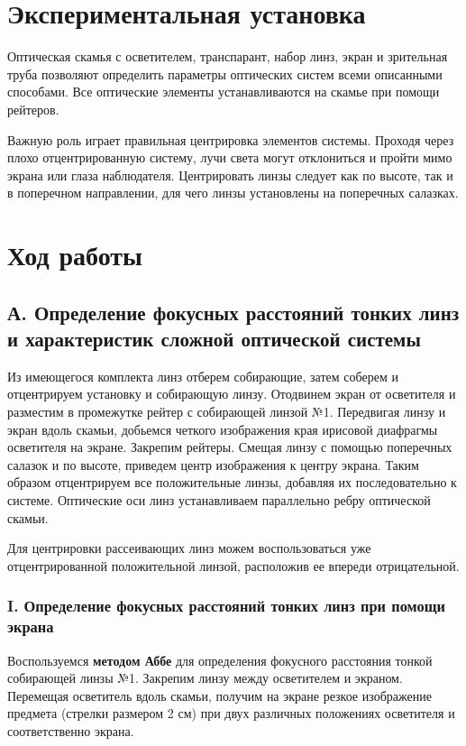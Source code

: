 \documentclass[a4paper,12pt]{article} %
\begin{document}
\section{Экспериментальная установка}
\hfill \break Оптическая скамья с осветителем, транспарант, набор линз, экран и зрительная труба позволяют определить параметры оптических систем всеми описанными способами. Все оптические элементы устанавливаются на скамье при помощи рейтеров.

\hfill \break Важную роль играет правильная центрировка элементов системы. Проходя через плохо отцентрированную систему, лучи света могут отклониться и пройти мимо экрана или глаза наблюдателя. Центрировать линзы следует как по высоте, так и в поперечном направлении, для чего линзы установлены на поперечных салазках.

\section{Ход работы}
\subsection*{А. Определение фокусных расстояний тонких линз и характеристик сложной оптической системы}
\hfill \break Из имеющегося комплекта линз отберем собирающие, затем соберем и отцентрируем установку и собирающую линзу. Отодвинем экран от осветителя и разместим в промежутке рейтер с собирающей линзой №1. Передвигая линзу и экран вдоль скамьи, добьемся четкого изображения края ирисовой диафрагмы осветителя на экране. Закрепим рейтеры. Смещая линзу с помощью поперечных салазок и по высоте, приведем центр изображения к центру экрана. Таким образом отцентрируем все положительные линзы, добавляя их последовательно к системе. Оптические оси линз устанавливаем параллельно ребру оптической скамьи.

\hfill \break Для центрировки рассеивающих линз можем воспользоваться уже отцентрированной положительной линзой, расположив ее впереди отрицательной.

\subsubsection*{I. Определение фокусных расстояний тонких линз при помощи экрана}
\hfill \break Воспользуемся \textbf{методом Аббе} для определения фокусного расстояния тонкой собирающей линзы №1. Закрепим линзу между осветителем и экраном. Перемещая осветитель вдоль скамьи, получим на экране резкое изображение предмета (стрелки размером 2 см) при двух различных положениях осветителя и соответственно экрана. 
\end{document}
